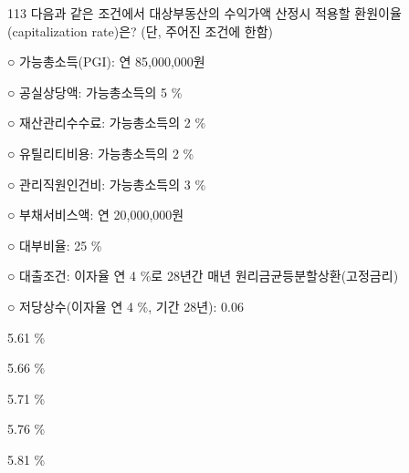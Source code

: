 \begin{question}{113}
다음과 같은 조건에서 대상부동산의 수익가액 산정시 적용할 환원이율(capitalization rate)은? (단, 주어진 조건에 한함)
\begin{framedtext}
○ 가능총소득(PGI): 연 85,000,000원 \par
○ 공실상당액: 가능총소득의 5 \% \par
○ 재산관리수수료: 가능총소득의 2 \% \par
○ 유틸리티비용: 가능총소득의 2 \% \par
○ 관리직원인건비: 가능총소득의 3 \% \par
○ 부채서비스액: 연 20,000,000원 \par
○ 대부비율: 25 \% \par
○ 대출조건: 이자율 연 4 \%로 28년간 매년 원리금균등분할상환(고정금리) \par
○ 저당상수(이자율 연 4 \%, 기간 28년): 0.06 \par
\end{framedtext}
\begin{choices}
  \item 5.61 \%
  \item 5.66 \%
  \item 5.71 \%
  \item 5.76 \%
  \item 5.81 \%
\end{choices}
\end{question}
